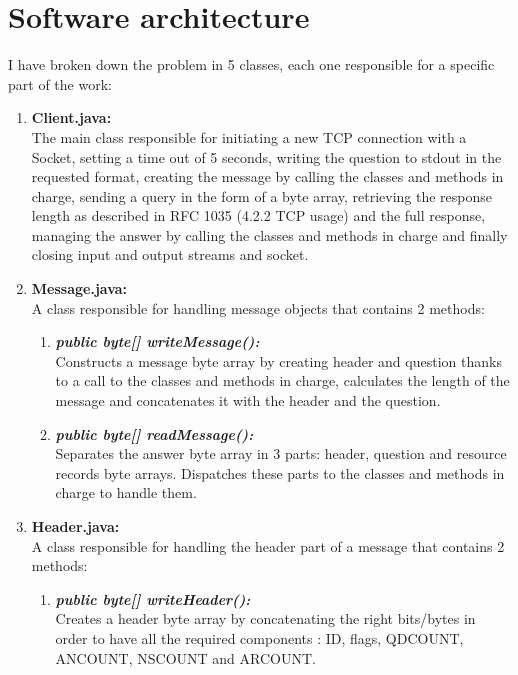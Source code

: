 \documentclass[a4paper, 11pt]{article}
\begin{document}
\section{Software architecture}
I have broken down the problem in 5 classes, each one responsible for a specific part of the work:
\begin{enumerate}
    \item \textbf{Client.java:}\\ The main class responsible for initiating a new TCP connection with a Socket, setting a time out of 5 seconds, writing the question to stdout in the requested format, creating the message by calling the classes and methods in charge, sending a query in the form of a byte array, retrieving the response length as described in RFC 1035 (4.2.2 TCP usage) and the full response, managing the answer by calling the classes and methods in charge and finally closing input and output streams and socket.
    
    \item \textbf{Message.java:}\\ A class responsible for handling message objects that contains 2 methods:
        \begin{enumerate}
            \item \textbf{\textit{public byte[] writeMessage():}}\\ Constructs a message byte array by creating header and question thanks to a call to the classes and methods in charge, calculates the length of the message and concatenates it with the header and the question.

            \item \textbf{\textit{public byte[] readMessage():}}\\ Separates the answer byte array in 3 parts: header, question and resource records byte arrays. Dispatches these parts to the classes and methods in charge to handle them.
        \end{enumerate}

    \item \textbf{Header.java:}\\ A class responsible for handling the header part of a message that contains 2 methods:
        \begin{enumerate}
            \item \textbf{\textit{public byte[] writeHeader():}}\\ Creates a header byte array by concatenating the right bits/bytes in order to have all the required components : ID, flags, QDCOUNT, ANCOUNT, NSCOUNT and ARCOUNT.


\end{enumerate}
\end{enumerate}
\end{document}
